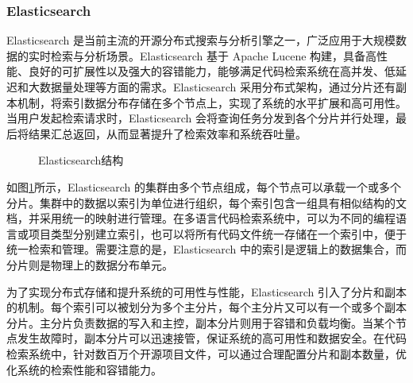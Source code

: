 \documentclass[UTF8,a4paper,12pt]{ctexart}
\numberwithin{equation}{section}
\begin{document}
\subsubsection{Elasticsearch}

Elasticsearch\cite{ref13} 是当前主流的开源分布式搜索与分析引擎之一，广泛应用于大规模数据的实时检索与分析场景。Elasticsearch 基于 Apache Lucene 构建，具备高性能、良好的可扩展性以及强大的容错能力，能够满足代码检索系统在高并发、低延迟和大数据量处理等方面的需求。Elasticsearch 采用分布式架构，通过分片还有副本机制，将索引数据分布存储在多个节点上，实现了系统的水平扩展和高可用性。当用户发起检索请求时，Elasticsearch 会将查询任务分发到各个分片并行处理，最后将结果汇总返回，从而显著提升了检索效率和系统吞吐量。\par

\begin{figure}[H]
	\caption{Elasticsearch结构}
	\label{es}
\end{figure}

如图\ref{es}所示，Elasticsearch 的集群由多个节点组成，每个节点可以承载一个或多个分片。集群中的数据以索引为单位进行组织，每个索引包含一组具有相似结构的文档，并采用统一的映射进行管理。在多语言代码检索系统中，可以为不同的编程语言或项目类型分别建立索引，也可以将所有代码文件统一存储在一个索引中，便于统一检索和管理。需要注意的是，Elasticsearch 中的索引是逻辑上的数据集合，而分片则是物理上的数据分布单元。\par

为了实现分布式存储\cite{ref13.5}和提升系统的可用性与性能，Elasticsearch 引入了分片和副本的机制。每个索引可以被划分为多个主分片，每个主分片又可以有一个或多个副本分片。主分片负责数据的写入和主控，副本分片则用于容错和负载均衡\cite{ref13.7}。当某个节点发生故障时，副本分片可以迅速接管，保证系统的高可用性和数据安全。在代码检索系统中，针对数百万个开源项目文件，可以通过合理配置分片和副本数量，优化系统的检索性能和容错能力。\par
\end{document}
